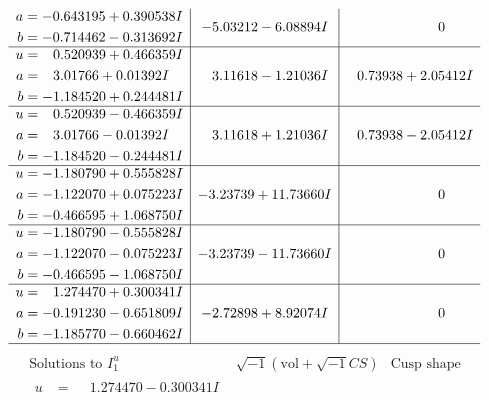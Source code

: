 \documentclass[1p]{elsarticle_modified}
\theoremstyle{definition}
\newcommand{\I}{\sqrt{-1}}
\begin{document}
$$\begin{array}{c|c|c}
\begin{aligned}
a &= -0.643195 + 0.390538 I \\
b &= -0.714462 - 0.313692 I\end{aligned}
 & -5.03212 - 6.08894 I & \phantom{-0.000000 } 0 \\ \hline\begin{aligned}
u &= \phantom{-}0.520939 + 0.466359 I \\
a &= \phantom{-}3.01766 + 0.01392 I \\
b &= -1.184520 + 0.244481 I\end{aligned}
 & \phantom{-}3.11618 - 1.21036 I & \phantom{-}0.73938 + 2.05412 I \\ \hline\begin{aligned}
u &= \phantom{-}0.520939 - 0.466359 I \\
a &= \phantom{-}3.01766 - 0.01392 I \\
b &= -1.184520 - 0.244481 I\end{aligned}
 & \phantom{-}3.11618 + 1.21036 I & \phantom{-}0.73938 - 2.05412 I \\ \hline\begin{aligned}
u &= -1.180790 + 0.555828 I \\
a &= -1.122070 + 0.075223 I \\
b &= -0.466595 + 1.068750 I\end{aligned}
 & -3.23739 + 11.73660 I & \phantom{-0.000000 } 0 \\ \hline\begin{aligned}
u &= -1.180790 - 0.555828 I \\
a &= -1.122070 - 0.075223 I \\
b &= -0.466595 - 1.068750 I\end{aligned}
 & -3.23739 - 11.73660 I & \phantom{-0.000000 } 0 \\ \hline\begin{aligned}
u &= \phantom{-}1.274470 + 0.300341 I \\
a &= -0.191230 - 0.651809 I \\
b &= -1.185770 - 0.660462 I\end{aligned}
 & -2.72898 + 8.92074 I & \phantom{-0.000000 } 0\\
 \hline 
 \end{array}$$\newpage$$\begin{array}{c|c|c}  
\text{Solutions to }I^u_{1}& \I (\text{vol} + \sqrt{-1}CS) & \text{Cusp shape}\\
 \hline 
\begin{aligned}
u &= \phantom{-}1.274470 - 0.300341 I \\

\end{aligned}
\end{array}$$
\end{document}

